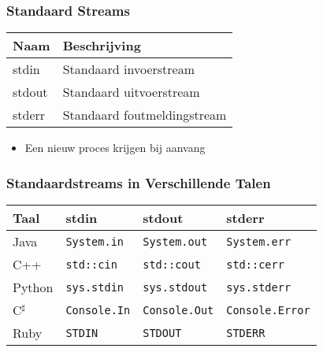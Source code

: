 \documentclass[dutch]{ucll-slides}
\begin{document}
\begin{frame}
  \frametitle{Standaard Streams}
  \begin{center}
    \begin{tabular}{ll}
      \bfseries Naam & \bfseries Beschrijving \\
      \toprule
      \ttfamily stdin  & Standaard invoerstream \\
      \ttfamily stdout & Standaard uitvoerstream \\
      \ttfamily stderr & Standaard foutmeldingstream \\
      \bottomrule
    \end{tabular}
  \end{center}
  \vskip4mm
  \begin{itemize}
    \item Een nieuw proces krijgen bij aanvang 
  \end{itemize}
  \begin{center}
  \end{center}
\end{frame}

\begin{frame}
  \frametitle{Standaardstreams in Verschillende Talen}
  \begin{center}
    \begin{tabular}{llll}
      \bfseries Taal & \bfseries stdin & \bfseries stdout & \bfseries stderr \\
      \toprule
      Java & \texttt{System.in} & \texttt{System.out} & \texttt{System.err} \\
      C++ & \texttt{std::cin} & \texttt{std::cout} & \texttt{std::cerr} \\
      Python & \texttt{sys.stdin} & \texttt{sys.stdout} & \texttt{sys.stderr} \\
      C$^\sharp$ & \texttt{Console.In} & \texttt{Console.Out} & \texttt{Console.Error} \\
      Ruby & \texttt{STDIN} & \texttt{STDOUT} & \texttt{STDERR} \\
      \bottomrule
    \end{tabular}
  \end{center}
\end{frame}
\end{document}
